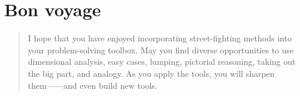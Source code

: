 \documentclass[a4paper,fleqn]{book}
\begin{document}
\section{Bon voyage}
\begin{quote}
\Large\begin{minipage}{\textwidth}I hope that you have enjoyed incorporating street-fighting methods into\\
your problem-solving toolbox. May you find diverse opportunities to use\\
dimensional analysis, easy cases, lumping, pictorial reasoning, taking out\\
the big part, and analogy. As you apply the tools, you will sharpen\\
them---—and even build new tools.
\end{minipage}
\end{quote}

\newpage
\mbox{}
\newpage
\end{document}
